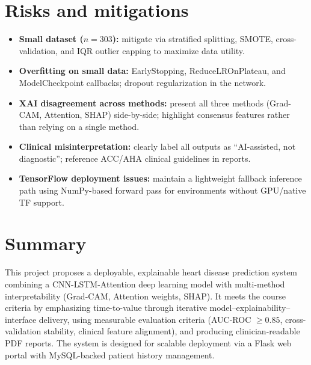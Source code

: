 \documentclass[11pt,a4paper]{article}
\begin{document}
\section{Risks and mitigations}
\begin{itemize}[leftmargin=0.7cm]
    \item \textbf{Small dataset ($n=303$):} mitigate via
      stratified splitting, SMOTE, cross-validation, and IQR
      outlier capping to maximize data utility.
    \item \textbf{Overfitting on small data:} EarlyStopping,
      ReduceLROnPlateau, and ModelCheckpoint callbacks; dropout
      regularization in the network.
    \item \textbf{XAI disagreement across methods:} present all
      three methods (Grad-CAM, Attention, SHAP) side-by-side;
      highlight consensus features rather than relying on a single
      method.
    \item \textbf{Clinical misinterpretation:} clearly label all
      outputs as ``AI-assisted, not diagnostic''; reference
      ACC/AHA clinical guidelines in reports.
    \item \textbf{TensorFlow deployment issues:} maintain a
      lightweight fallback inference path using NumPy-based
      forward pass for environments without GPU/native TF support.
\end{itemize}

\section{Summary}
This project proposes a deployable, explainable heart disease
prediction system combining a CNN-LSTM-Attention deep learning
model with multi-method interpretability (Grad-CAM, Attention
weights, SHAP). It meets the course criteria by emphasizing
time-to-value through iterative model--explainability--interface
delivery, using measurable evaluation criteria (AUC-ROC $\geq 0.85$,
cross-validation stability, clinical feature alignment), and
producing clinician-readable PDF reports. The system is designed
for scalable deployment via a Flask web portal with MySQL-backed
patient history management.
\end{document}
